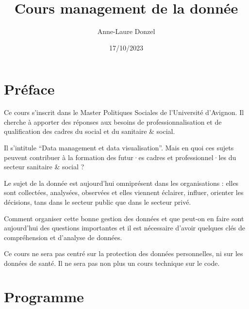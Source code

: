 \documentclass[
  letterpaper,
  DIV=11,
  numbers=noendperiod]{scrreprt}
\title{Cours management de la donnée}
\author{Anne-Laure Donzel}
\date{17/10/2023}
\renewcommand*\contentsname{Table of contents}
\newcommand\contentsname{Table of contents}
\begin{document}
\maketitle
\ifdefined\Shaded\renewenvironment{Shaded}{\begin{tcolorbox}[boxrule=0pt, interior hidden, borderline west={3pt}{0pt}{shadecolor}, sharp corners, frame hidden, breakable, enhanced]}{\end{tcolorbox}}\fi

\renewcommand*\contentsname{Table of contents}
{
\hypersetup{linkcolor=}
\setcounter{tocdepth}{2}
\tableofcontents
}

\hypertarget{pruxe9face}{%
\chapter*{Préface}\label{pruxe9face}}

Ce cours s'inscrit dans le Master Politiques Sociales de l'Université
d'Avignon. Il cherche à apporter des réponses aux besoins de
professionnalisation et de qualification des cadres du social et du
sanitaire \& social.

Il s'intitule ``Data management et data visualisation''. Mais en quoi
ces sujets peuvent contribuer à la formation des futur·es cadres et
professionnel·les du secteur sanitaire \& social ?

Le sujet de la donnée est aujourd'hui omniprésent dans les organisations
: elles sont collectées, analysées, observées et elles viennent
éclairer, influer, orienter les décisions, tans dans le secteur public
que dans le secteur privé.

Comment organiser cette bonne gestion des données et que peut-on en
faire sont aujourd'hui des questions importantes et il est nécessaire
d'avoir quelques clés de compréhension et d'analyse de données.

Ce cours ne sera pas centré sur la protection des données personnelles,
ni sur les données de santé. Il ne sera pas non plus un cours technique
sur le code.


\hypertarget{programme}{%
\chapter{Programme}\label{programme}}
\end{document}
